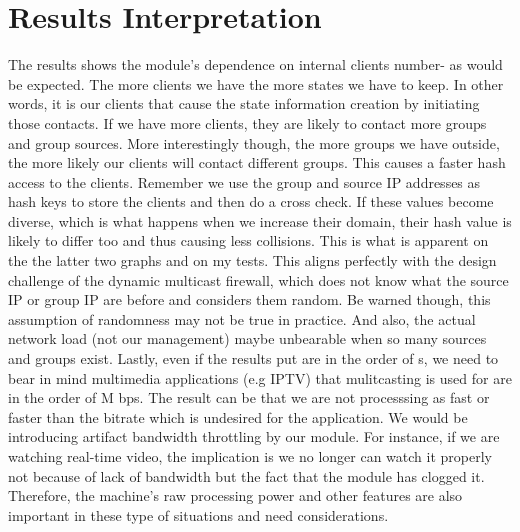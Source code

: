 \section{Results Interpretation}
The results shows the module's dependence on internal clients number- as would
be expected. The more clients we have the more states we have to keep. In other
words, it is our clients that cause the state information creation by initiating those
contacts. If we have more clients, they are likely to contact more groups and group
sources.
More interestingly though, the more groups we have outside, the more likely
our clients will contact different groups. This causes a faster hash access to the
clients. Remember we use the group and source IP addresses as hash keys to store
the clients and then do a cross check. If these values become diverse, which is
what happens when we increase their domain, their hash value is likely to differ
too and thus causing less collisions. This is what is apparent on the the latter
two graphs and on my tests. This aligns perfectly with the design challenge of
the dynamic multicast firewall, which does not know what the source IP or group
IP are before and considers them random. Be warned though, this assumption of
randomness may not be true in practice. And also, the actual network load (not
our management) maybe unbearable when so many sources and groups exist.
Lastly, even if the results put are in the order of {\mu s}, we need to bear in mind
multimedia applications (e.g IPTV) that mulitcasting is used for are in the order of
M bps. The result can be that we are not processsing as fast or faster than the bitrate
which is undesired for the application. We would be introducing artifact bandwidth
throttling by our module. For instance, if we are watching real-time video, the
implication is we no longer can watch it properly not because of lack of bandwidth
but the fact that the module has clogged it. Therefore, the machine's raw processing
power and other features are also important in these type of situations and need
considerations.

